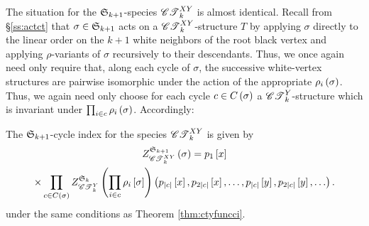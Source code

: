 \documentclass[distribution,draft]{brandiss} %
\numberwithin{section}{chapter}
\numberwithin{figure}{chapter}
\begin{document}
The situation for the $ \mathfrak{S}_{k+1} $-species $\mathscr{CT}_{k}^{XY}$ is almost identical.
Recall from \S \ref{ss:actct} that $\sigma \in  \mathfrak{S}_{k+1} $ acts on a $\mathscr{CT}_{k}^{XY}$-structure $T$ by applying $\sigma$ directly to the linear order on the $k+1$ white neighbors of the root black vertex and applying $\rho$-variants of $\sigma$ recursively to their descendants.
Thus, we once again need only require that, along each cycle of $\sigma$, the successive white-vertex structures are pairwise isomorphic under the action of the appropriate $\rho_{i} \left( {\sigma} \right)$.
Thus, we again need only choose for each cycle $c \in C \left( {\sigma} \right)$ a $\mathscr{CT}_{k}^{Y}$-structure which is invariant under $\prod_{i \in c} \rho_{i} \left( {\sigma} \right)$.
Accordingly:
\begin{theorem}
  \label{thm:ctxyfuncci}
  The $ \mathfrak{S}_{k+1} $-cycle index for the species $\mathscr{CT}_{k}^{XY}$ is given by
  \begin{multline}
    \label{eq:ctxyfuncci}
    \gcielt{\symgp{k+1}}{\ctxy{k}}{\sigma} = p_{1} \sbrac{x} \\
    \times \prod_{c \in C \pbrac{\sigma}} \gcieltvars{\symgp{k}}{\cty{k}}{\prod_{i \in c} \rho_{i} \sbrac{\sigma}}{p_{\abs{c}} \sbrac{x}, p_{2 \abs{c}} \sbrac{x}, \dots, p_{\abs{c}} \sbrac{y}, p_{2 \abs{c}} \sbrac{y}, \dots}.
  \end{multline}
  under the same conditions as Theorem \ref{thm:ctyfuncci}.
\end{theorem}
\end{document}
